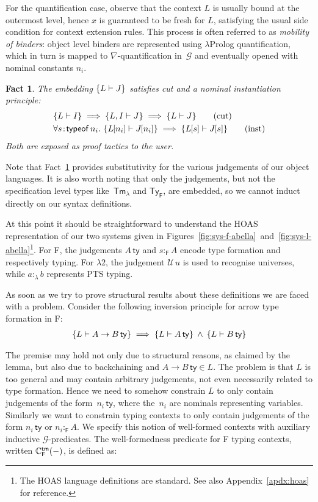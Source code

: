 \documentclass[a4paper,UKenglish]{lipics-v2016}
\newcommand{\ms}{\,}
\newcommand{\mrel}[1]{\mathrel{\ms #1 \ms}}
\newcommand{\mAnd}{\mrel{\wedge}}
\newcommand{\mAll}[1]{\ensuremath{\forall} #1.\ms\ms}
\newcommand{\SysL}{$\lambda2$\xspace}
\newcommand{\TyF}{\ensuremath{\mathsf{Ty_{F}}}}
\newcommand{\TmL}{\ensuremath{\mathsf{Tm_{\lambda}}}}
\newcommand{\of}{\ensuremath{\!:\!}}
\newcommand{\istyFh}[1]{\ensuremath{#1\ms\mathsf{ty}}}
\newcommand{\typingFh}[2]{\ensuremath{#1 \mathbin{:_{\mathsf{F}}} #2}}
\newcommand{\sortLh}[1]{\ensuremath{\mathcal{U}\ms#1}}
\newcommand{\typingLh}[2]{\ensuremath{#1 \mathbin{:_{\lambda}} #2}}
\newcommand{\subst}[1]{\hphantom{|}\!\![{#1}]}
\theoremstyle{plain}
\newtheorem{fact}[theorem]{Fact}
\begin{document}
For the quantification case, observe that the context $L$ is usually bound at the outermost level, hence $x$ is guaranteed to be fresh for $L$, satisfying the usual side condition for context extension rules.
This process is often referred to as \emph{mobility of binders}: object level binders are represented using $\lambda$Prolog quantification, which in turn is mapped to $\nabla$-quantification in~$\mathcal{G}$ and eventually opened with nominal constants $n_i$.
\begin{fact}
  \label{fac:ab-cut-inst}
  The embedding $\{L \vdash J\}$ satisfies cut and a nominal instantiation principle:
  \begin{align*}
    &\aj{L}{I} \implies \aj{L,I}{J} \implies \aj{L}{J} \tag{cut} \\
    &\mAll{s \of \mathsf{typeof}\, n_i} \aj{L\subst{n_i}}{J\subst{n_i}} \implies \aj{L\subst{s}}{J\subst{s}} \tag{inst}
  \end{align*}
  Both are exposed as proof tactics to the user.\hfill\qedsymbol
\end{fact}
Note that Fact~\ref{fac:ab-cut-inst} provides substitutivity for the various judgements of our object languages.
It is also worth noting that only the judgements, but not the specification level types like~$\TmL$ and $\TyF$, are embedded, so we cannot induct directly on our syntax definitions.

At this point it should be straightforward to understand the HOAS representation of our two systems given in Figures~\ref{fig:sys-f-abella}~and~\ref{fig:sys-l-abella}\footnote{The HOAS language definitions are standard. See also Appendix~\ref{apdx:hoas} for reference.}.
For F, the judgements $\istyFh{A}$ and $\typingFh{s}{A}$ encode type formation and respectively typing.
For \SysL, the judgement $\sortLh{u}$ is used to recognise universes, while $\typingLh{a}{b}$ represents PTS typing.

As soon as we try to prove structural results about these definitions we are faced with a problem.
Consider the following inversion principle for arrow type formation in F:
\begin{align*}
  \aj{L}{\istyFh{A \to B}} \implies \aj{L}{\istyFh{A}} \mAnd \aj{L}{\istyFh{B}}
\end{align*}

The premise may hold not only due to structural reasons, as claimed by the lemma, but also due to backchaining and $\istyFh{A \to B} \in L$.
The problem is that $L$ is too general and may contain arbitrary judgements, not even necessarily related to type formation.
Hence we need to somehow constrain $L$ to only contain judgements of the form~$\istyFh{n_i}$, where the~$n_i$ are nominals representing variables.
Similarly we want to constrain typing contexts to only contain judgements of the form $\istyFh{n_i}$ or $\typingFh{n_i}{A}$.
We specify this notion of well-formed contexts  with auxiliary inductive $\mathcal{G}$-predicates.
The well-formedness predicate for F typing contexts, written $\mathbb{C}_{\mathsf{F}}^{\mathsf{tm}} (-)$, is defined as:
\end{document}
